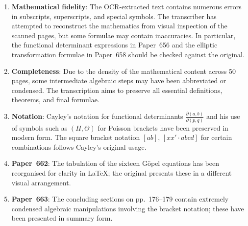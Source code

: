 \documentclass[11pt,a4paper]{article}
\theoremstyle{plain}
\theoremstyle{definition}
\begin{document}
\begin{enumerate}[leftmargin=2em]
\item \textbf{Mathematical fidelity}: The OCR-extracted text contains numerous errors in subscripts, superscripts, and special symbols. The transcriber has attempted to reconstruct the mathematics from visual inspection of the scanned pages, but some formulae may contain inaccuracies. In particular, the functional determinant expressions in Paper~656 and the elliptic transformation formulae in Paper~658 should be checked against the original.

\item \textbf{Completeness}: Due to the density of the mathematical content across 50 pages, some intermediate algebraic steps may have been abbreviated or condensed. The transcription aims to preserve all essential definitions, theorems, and final formulae.

\item \textbf{Notation}: Cayley's notation for functional determinants $\frac{\partial(a, b)}{\partial(p, q)}$ and his use of symbols such as $(H, \Theta)$ for Poisson brackets have been preserved in modern form. The square bracket notation $[ab]$, $[xx' \cdot abcd]$ for certain combinations follows Cayley's original usage.

\item \textbf{Paper~662}: The tabulation of the sixteen G\"{o}pel equations has been reorganised for clarity in \LaTeX; the original presents these in a different visual arrangement.

\item \textbf{Paper~663}: The concluding sections on pp.~176--179 contain extremely condensed algebraic manipulations involving the bracket notation; these have been presented in summary form.
\end{enumerate}
\end{document}
